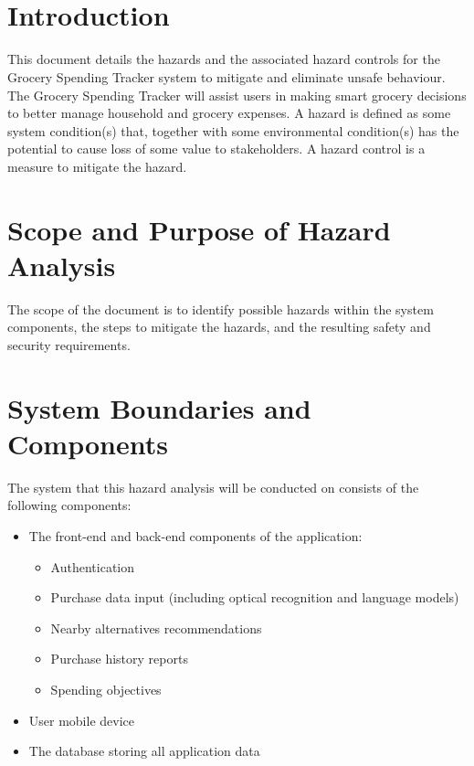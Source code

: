 \documentclass{article}
\begin{document}
~\newpage

\tableofcontents

~\newpage

\listoftables

\listoffigures

\newpage


\section{Introduction}
This document details the hazards and the associated hazard controls for the Grocery Spending Tracker system to mitigate and eliminate unsafe behaviour. The Grocery Spending Tracker will assist users in making smart grocery decisions to better manage household and grocery expenses.  A hazard is defined as some system condition(s) that, together with some environmental condition(s) has the potential to cause loss of some value to stakeholders. A hazard control is a measure to mitigate the hazard.

\section{Scope and Purpose of Hazard Analysis}
The scope of the document is to identify possible hazards within the system components, the steps to mitigate the hazards, and the resulting safety and security requirements.

\section{System Boundaries and Components}
The system that this hazard analysis will be conducted on consists of the following components:
\begin{itemize}
    \item The front-end and back-end components of the application:
        \begin{itemize}
            \item Authentication
            \item Purchase data input (including optical recognition and language models)
            \item Nearby alternatives recommendations
            \item Purchase history reports
            \item Spending objectives
        \end{itemize}
    \item User mobile device
    \item The database storing all application data
\end{itemize}
\end{document}
